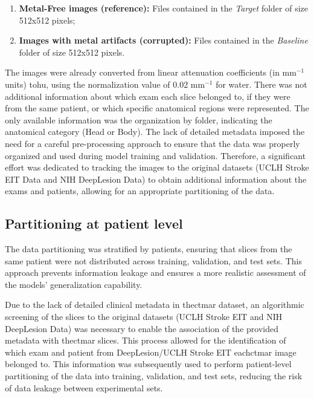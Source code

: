 \begin{enumerate}
    \item \textbf{Metal-Free images (reference):} Files contained in the \textit{Target} folder of size 512x512 pixels;
    \item \textbf{Images with metal artifacts (corrupted):} Files contained in the \textit{Baseline} folder of size 512x512 pixels.
\end{enumerate}

The images were already converted from linear attenuation coefficients (in mm$^{-1}$ units) to\Acrfull{hu}, using the normalization value of 0.02 mm$^{-1}$ for water.
There was not additional information about which exam each slice belonged to, if they were from the same patient, or which specific anatomical regions were represented. The only available information was the organization by folder, indicating the anatomical category (Head or Body). The lack of detailed metadata imposed the need for a careful pre-processing approach to ensure that the data was properly organized and used during model training and validation. Therefore, a significant effort was dedicated to tracking the images to the original datasets (UCLH Stroke EIT Data and NIH DeepLesion Data) to obtain additional information about the exams and patients, allowing for an appropriate partitioning of the data.

\subsection{Partitioning at patient level}

The data partitioning was stratified by patients, ensuring that slices from the same patient were not distributed across training, validation, and test sets. This approach prevents information leakage and ensures a more realistic assessment of the models' generalization capability.


Due to the lack of detailed clinical metadata in the\acrshort{ctmar} dataset, an algorithmic screening of the slices to the original datasets (UCLH Stroke EIT and NIH DeepLesion Data) was necessary to enable the association of the provided metadata with the\acrshort{ctmar} slices. This process allowed for the identification of which exam and patient from DeepLesion/UCLH Stroke EIT each\acrshort{ctmar} image belonged to. This information was subsequently used to perform patient-level partitioning of the data into training, validation, and test sets, reducing the risk of data leakage between experimental sets.


